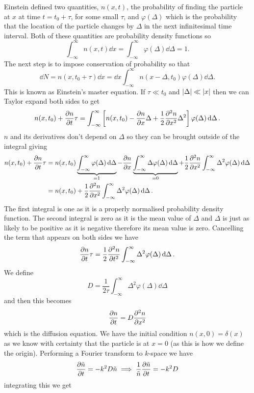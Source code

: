 \documentclass[a4paper]{article}
\begin{document}
    Einstein defined two quantities, \(n(x, t)\), the probability of finding the particle at \(x\) at time \(t = t_0 + \tau\), for some small \(\tau\), and \(\varphi(\Delta)\) which is the probability that the location of the particle changes by \(\Delta\) in the next infinitesimal time interval.
    Both of these quantities are probability density functions so
    \[\int_{-\infty}^{\infty} n(x, t)\dd{x} =  \int_{-\infty}^{\infty} \varphi(\Delta)\dd{\Delta} = 1.\]
    The next step is to impose conservation of probability so that
    \[\dd{N} = n(x, t_0 + \tau) \dd{x} = \dd{x} \int_{-\infty}^{\infty} n(x - \Delta, t_0)\varphi(\Delta) \dd{\Delta}.\]
    This is known as Einstein's master equation.
    If \(\tau \ll t_0\) and \(\abs{\Delta} \ll \abs{x}\) then we can Taylor expand both sides to get
    \[n(x, t_0) + \pdv{n}{t}\tau = \int_{-\infty}^{\infty} \left[n(x, t_0) - \pdv{n}{x}\Delta + \frac{1}{2}\pdv[2]{n}{x}\Delta^2\right]\varphi(\Delta)\dd{\Delta}.\]
    \(n\) and its derivatives don't depend on \(\Delta\) so they can be brought outside of the integral giving
    \begin{align*}
        n(x, t_0) + \pdv{n}{t}\tau &= n(x, t_0) \underbrace{\int_{-\infty}^{\infty} \varphi(\Delta)\dd{\Delta}}_{=1} - \pdv{n}{x} \underbrace{\int_{-\infty}^{\infty} \Delta\varphi(\Delta) \dd{\Delta}}_{=0} + \frac{1}{2}\pdv[2]{n}{x} \int_{-\infty}^{\infty} \Delta^2\varphi(\Delta)\dd{\Delta}\\
        &= n(x, t_0) + \frac{1}{2}\pdv[2]{n}{x}\int_{-\infty}^{\infty} \Delta^2\varphi(\Delta)\dd{\Delta}.
    \end{align*}
    The first integral is one as it is a properly normalised probability density function.
    The second integral is zero as it is the mean value of \(\Delta\) and \(\Delta\) is just as likely to be positive as it is negative therefore its mean value is zero.
    Cancelling the term that appears on both sides we have
    \[\pdv{n}{t}\tau = \frac{1}{2}\pdv[2]{n}{t}\int_{-\infty}^{\infty} \Delta^2\varphi(\Delta)\dd{\Delta}.\]
    We define
    \[D = \frac{1}{2\tau}\int_{-\infty}^{\infty} \Delta^2\varphi(\Delta)\dd{\Delta}\]
    and then this becomes
    \[\pdv{n}{t} = D\pdv[2]{n}{x}\]
    which is the diffusion equation.
    We have the initial condition \(n(x, 0) = \delta(x)\) as we know with certainty that the particle is at \(x = 0\) (as this is how we define the origin).
    Performing a Fourier transform to \(k\)-space we have
    \[\pdv{\tilde{n}}{t} = -k^2D\tilde{n} \implies \frac{1}{\tilde{n}}\pdv{\tilde{n}}{t} = -k^2D\]
    integrating this we get
\end{document}
